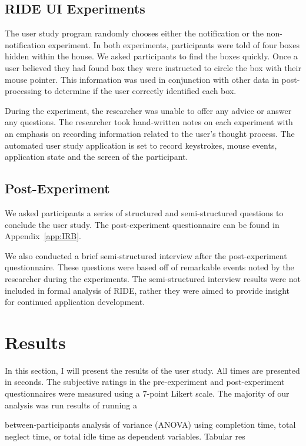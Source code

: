 \subsection{RIDE UI Experiments} %
\label{sub:ride_ui_experiments}
The user study program randomly chooses either the notification or the non-notification experiment. In both experiments, participants were told of four boxes hidden within the house. We asked participants to find the boxes quickly. Once a user believed they had found box they were instructed to circle the box with their mouse pointer. This information was used in conjunction with other data in post-processing to determine if the user correctly identified each box.

During the experiment, the researcher was unable to offer any advice or answer any questions. The researcher took hand-written notes on each experiment with an emphasis on recording information related to the user's thought process. The automated user study application is set to record keystrokes, mouse events, application state and the screen of the participant.


\subsection{Post-Experiment} %
\label{sub:post_experiment}
We asked participants a series of structured and semi-structured questions to conclude the user study. The post-experiment questionnaire can be found in Appendix~\ref{app:IRB}.

We also conducted a brief semi-structured interview after the post-experiment questionnaire. These questions were based off of remarkable events noted by the researcher during the experiments. The semi-structured interview results were not included in formal analysis of RIDE, rather they were aimed to provide insight for continued application development.

\section{Results}
\label{sec:study-results}
In this section, I will present the results of the user study. All times are presented in seconds. The subjective ratings in the pre-experiment and post-experiment questionnaires were measured using a 7-point Likert scale. The majority of our analysis was run results of running a

between-participants analysis of variance (ANOVA) using completion time, total neglect time, or total idle time as dependent variables. Tabular res